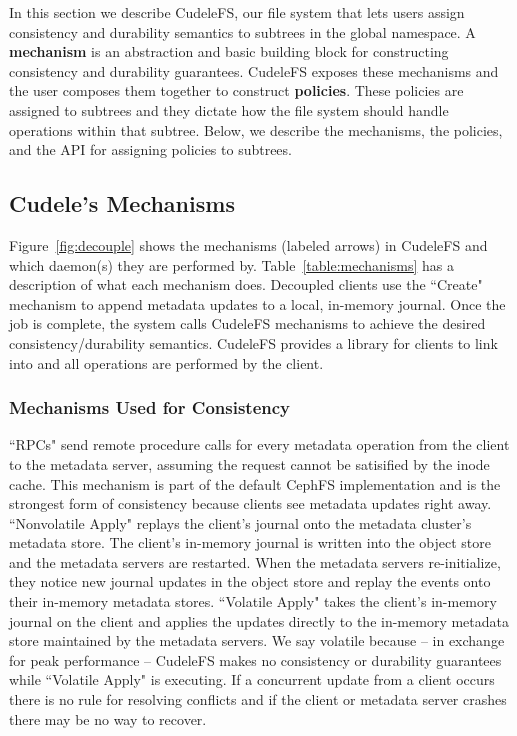 In this section we describe CudeleFS, our file system that lets users
assign consistency and durability semantics to subtrees in the global
namespace. A \textbf{mechanism} is an abstraction and basic building block for
constructing consistency and durability guarantees. CudeleFS exposes these
mechanisms and the user composes them together to construct
\textbf{policies}. These policies are assigned to subtrees and they dictate how
the file system should handle operations within that subtree.  Below, we
describe the mechanisms, the policies, and the API for assigning policies to
subtrees.

\subsection{Cudele's Mechanisms}
\label{sec:cudeles-mechanisms}

Figure~\ref{fig:decouple} shows the mechanisms (labeled arrows) in CudeleFS and
which daemon(s) they are performed by.  Table~\ref{table:mechanisms} has a
description of what each mechanism does.  Decoupled clients use the ``Create"
mechanism to append metadata updates to a local, in-memory journal. Once the
job is complete, the system calls CudeleFS mechanisms to achieve the desired
consistency/durability semantics.  CudeleFS provides a library for clients to
link into and all operations are performed by the client.  

\subsubsection{Mechanisms Used for Consistency} ``RPCs" send remote procedure
calls for every metadata operation from the client to the metadata server,
assuming the request cannot be satisified by the inode cache. This mechanism is
part of the default CephFS implementation and is the strongest form of
consistency because clients see metadata updates right away.  ``Nonvolatile
Apply" replays the client's journal onto the metadata cluster's metadata store.
The client's in-memory journal is written into the object store and the
metadata servers are restarted. When the metadata servers re-initialize, they
notice new journal updates in the object store and replay the events onto their
in-memory metadata stores.  ``Volatile Apply" takes the client's in-memory journal on the
client and applies the updates directly to the in-memory metadata store maintained
by the metadata servers. We say volatile because -- in exchange for peak
performance -- CudeleFS makes no consistency or durability guarantees while
``Volatile Apply" is executing.  If a concurrent update from a client occurs
there is no rule for resolving conflicts and if the client or metadata server
crashes there may be no way to recover.

